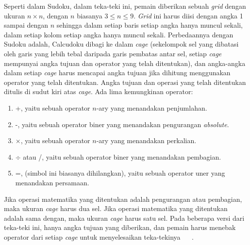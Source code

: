 Seperti dalam Sudoku, dalam teka-teki ini, pemain diberikan sebuah \textit{grid} dengan ukuran \begin{math}n \times n\end{math}, dengan \begin{math}n\end{math} biasanya \begin{math}3 \leq n \leq 9\end{math}. \textit{Grid} ini harus diisi dengan angka 1 sampai dengan \begin{math}n\end{math} sehingga dalam setiap baris setiap angka hanya muncul sekali, dalam setiap kolom setiap angka hanya muncul sekali. Perbedaannya dengan Sudoku adalah, Calcudoku dibagi ke dalam \textit{cage} (sekelompok sel yang dibatasi oleh garis yang lebih tebal daripada garis pembatas antar sel, setiap \textit{cage} mempunyai angka tujuan dan operator yang telah ditentukan), dan angka-angka dalam setiap \textit{cage} harus mencapai angka tujuan jika dihitung menggunakan operator yang telah ditentukan. Angka tujuan dan operasi yang telah ditentukan ditulis di sudut kiri atas \textit{cage}. Ada lima kemungkinan operator:
\begin{enumerate}
\item +, yaitu sebuah operator \begin{math}n\end{math}-ary yang menandakan penjumlahan.
\item -, yaitu sebuah operator biner yang menandakan pengurangan \textit{absolute}.
\item \begin{math}\times\end{math}, yaitu sebuah operator \begin{math}n\end{math}-ary yang menandakan perkalian.
\item \begin{math}\div\end{math} atau /, yaitu sebuah operator biner yang menandakan pembagian.
\item =, (simbol ini biasanya dihilangkan), yaitu sebuah operator uner yang menandakan persamaan.
\end{enumerate}
Jika operasi matematika yang ditentukan adalah pengurangan atau pembagian, maka ukuran \textit{cage} harus dua sel. Jika operasi matematika yang ditentukan adalah sama dengan, maka ukuran \textit{cage} harus satu sel. Pada beberapa versi dari teka-teki ini, hanya angka tujuan yang diberikan, dan pemain harus menebak operator dari setiap \textit{cage} untuk menyelesaikan teka-tekinya ~\cite{fahda:16:backtracking} ~\cite{johanna:12:hybrid}.

